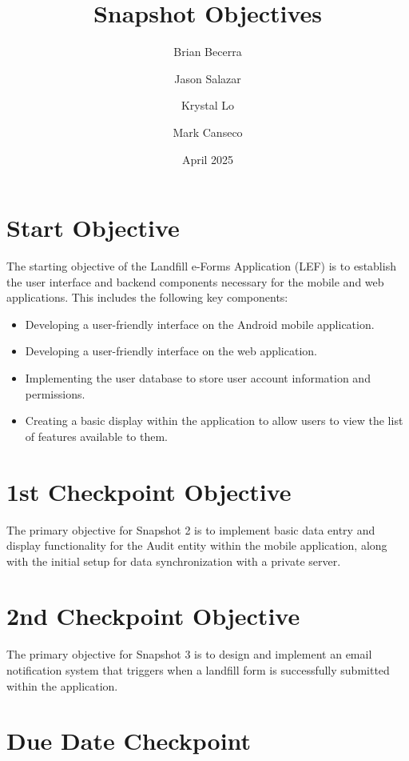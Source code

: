 \documentclass[12pt]{article}
\title{Snapshot Objectives}
\author{
    Brian Becerra\\
    \and
    Jason Salazar\\
    \and
    Krystal Lo\\
    \and
    Mark Canseco\\
    }
\date{April 2025}
\begin{document}
\begin{titlepage}
\maketitle
\thispagestyle{empty}
\end{titlepage}

\section*{Start Objective}
The starting objective of the Landfill e-Forms Application (LEF) is to establish the user interface and backend components necessary for the mobile and web applications. This includes the following key components:\\
\begin{itemize}
    \item Developing a user-friendly interface on the Android mobile application.
    \item  Developing a user-friendly interface on the web application.
    \item Implementing the user database to store user account information and permissions.
    \item Creating a basic display within the application to allow users to view the list of features available to them. 
\end{itemize}

\section*{1st Checkpoint Objective}

The primary objective for Snapshot 2 is to implement basic data entry and display functionality for the Audit entity within the mobile application, along with the initial setup for data synchronization with a private server.

\section*{2nd Checkpoint Objective}

The primary objective for Snapshot 3 is to design and implement an email notification system that triggers when a landfill form is successfully submitted within the application.

\section*{Due Date Checkpoint}
\end{document}
